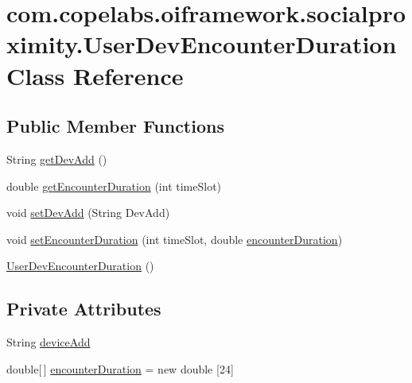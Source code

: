 \hypertarget{classcom_1_1copelabs_1_1oiframework_1_1socialproximity_1_1_user_dev_encounter_duration}{}\section{com.\+copelabs.\+oiframework.\+socialproximity.\+User\+Dev\+Encounter\+Duration Class Reference}
\label{classcom_1_1copelabs_1_1oiframework_1_1socialproximity_1_1_user_dev_encounter_duration}
\subsection*{Public Member Functions}
\begin{DoxyCompactItemize}
\item 
String \hyperlink{classcom_1_1copelabs_1_1oiframework_1_1socialproximity_1_1_user_dev_encounter_duration_ac41e996b87a4e8d781a454a1ace24338}{get\+Dev\+Add} ()
\item 
double \hyperlink{classcom_1_1copelabs_1_1oiframework_1_1socialproximity_1_1_user_dev_encounter_duration_ae07a811317e84973ce0424d27daa27c3}{get\+Encounter\+Duration} (int time\+Slot)
\item 
void \hyperlink{classcom_1_1copelabs_1_1oiframework_1_1socialproximity_1_1_user_dev_encounter_duration_a09ba5a0ec1e58839efc7dbee195a2a55}{set\+Dev\+Add} (String Dev\+Add)
\item 
void \hyperlink{classcom_1_1copelabs_1_1oiframework_1_1socialproximity_1_1_user_dev_encounter_duration_a6ae1e34cd9c2ec051b00eefcb9b2ffc5}{set\+Encounter\+Duration} (int time\+Slot, double \hyperlink{classcom_1_1copelabs_1_1oiframework_1_1socialproximity_1_1_user_dev_encounter_duration_a1581a2e5cdbdd45dfb462bcab575bb48}{encounter\+Duration})
\item 
\hyperlink{classcom_1_1copelabs_1_1oiframework_1_1socialproximity_1_1_user_dev_encounter_duration_ab779b01d525a729970459520de14c85a}{User\+Dev\+Encounter\+Duration} ()
\end{DoxyCompactItemize}
\subsection*{Private Attributes}
\begin{DoxyCompactItemize}
\item 
String \hyperlink{classcom_1_1copelabs_1_1oiframework_1_1socialproximity_1_1_user_dev_encounter_duration_ad00928d4a4af4d92feeeb35c9e66a2f4}{device\+Add}
\item 
double\mbox{[}$\,$\mbox{]} \hyperlink{classcom_1_1copelabs_1_1oiframework_1_1socialproximity_1_1_user_dev_encounter_duration_a1581a2e5cdbdd45dfb462bcab575bb48}{encounter\+Duration} = new double \mbox{[}24\mbox{]}
\end{DoxyCompactItemize}


